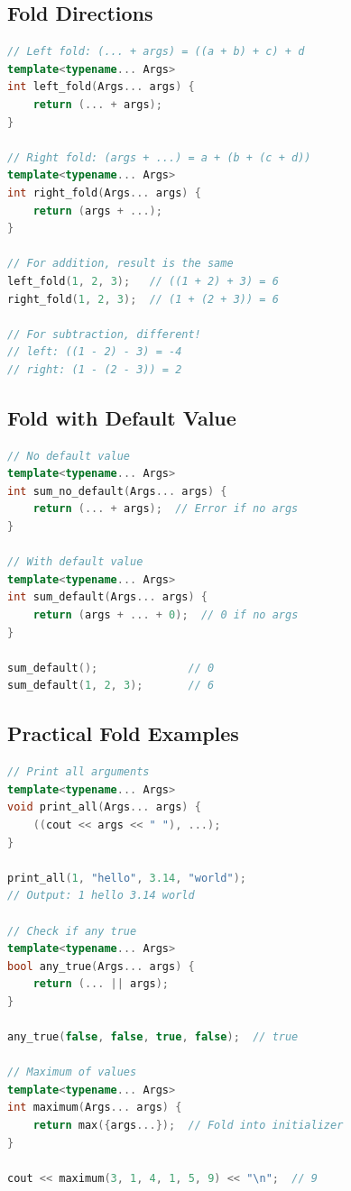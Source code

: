 \hypertarget{fold-directions}{%
\subsection{Fold Directions}\label{fold-directions}}

\begin{lstlisting}[language={C++}]
// Left fold: (... + args) = ((a + b) + c) + d
template<typename... Args>
int left_fold(Args... args) {
    return (... + args);
}

// Right fold: (args + ...) = a + (b + (c + d))
template<typename... Args>
int right_fold(Args... args) {
    return (args + ...);
}

// For addition, result is the same
left_fold(1, 2, 3);   // ((1 + 2) + 3) = 6
right_fold(1, 2, 3);  // (1 + (2 + 3)) = 6

// For subtraction, different!
// left: ((1 - 2) - 3) = -4
// right: (1 - (2 - 3)) = 2
\end{lstlisting}

\hypertarget{fold-with-default-value}{%
\subsection{Fold with Default Value}\label{fold-with-default-value}}

\begin{lstlisting}[language={C++}]
// No default value
template<typename... Args>
int sum_no_default(Args... args) {
    return (... + args);  // Error if no args
}

// With default value
template<typename... Args>
int sum_default(Args... args) {
    return (args + ... + 0);  // 0 if no args
}

sum_default();              // 0
sum_default(1, 2, 3);       // 6
\end{lstlisting}

\hypertarget{practical-fold-examples}{%
\subsection{Practical Fold Examples}\label{practical-fold-examples}}

\begin{lstlisting}[language={C++}]
// Print all arguments
template<typename... Args>
void print_all(Args... args) {
    ((cout << args << " "), ...);
}

print_all(1, "hello", 3.14, "world");
// Output: 1 hello 3.14 world

// Check if any true
template<typename... Args>
bool any_true(Args... args) {
    return (... || args);
}

any_true(false, false, true, false);  // true

// Maximum of values
template<typename... Args>
int maximum(Args... args) {
    return max({args...});  // Fold into initializer
}

cout << maximum(3, 1, 4, 1, 5, 9) << "\n";  // 9
\end{lstlisting}

